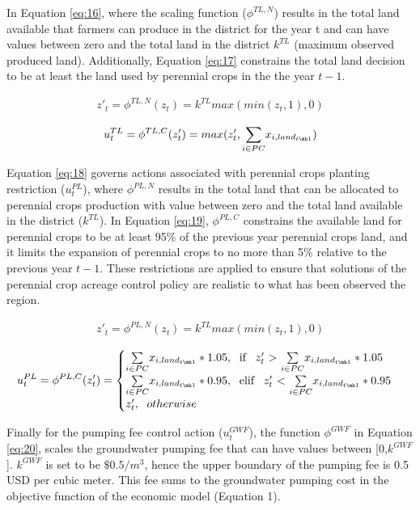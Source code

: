 \documentclass[a4paper,fleqn]{cas-sc}
\begin{document}
In Equation \ref{eq:16}, where the scaling function ($\phi^{TL,N}$) results in the total land available that farmers can produce in the district for the year t and can have values between zero and the total land in the district $k^{TL}$ (maximum observed produced land). Additionally, Equation \ref{eq:17} constrains the total land decision to be at least the land used by perennial crops in the the year $t-1$.

\begin{align}\label{eq:16}
z'_{t} = \phi^{TL,N}(z_{t}) = k^{TL}max(min(z_{t},1),0)
\end{align}

\begin{align}\label{eq:17}
u^{TL}_t = \phi^{TL,C}(z'_{t})= max(z'_{t},\underset{i \in PC}{\sum} x_{i,land_{t\mh1}})
\end{align}

Equation \ref{eq:18} governs actions associated with perennial crops planting restriction ($u^{PL}_t$), where $\phi^{PL,N}$ results in the total land that can be allocated to perennial crops production with value between zero and the total land available in the district ($k^{TL}$). In Equation \ref{eq:19}, $\phi^{PL,C}$ constrains the available land for perennial crops to be at least 95\% of the previous year perennial crops land, and it limits the expansion of perennial crops to no more than 5\% relative to the previous year $t-1$. These restrictions are applied to ensure that solutions of the perennial crop acreage control policy are realistic to what has been observed the region.

\begin{align}\label{eq:18}
z'_{t} = \phi^{PL,N}(z_{t}) = k^{TL}max(min(z_{t},1),0)
\end{align}

\begin{align}\label{eq:19}
u^{PL}_t = \phi^{PL,C}(z'_{t})= \begin{cases}
      \underset{i\in{PC}}{\sum} x_{i,land_{t\mh1}}*1.05,  \text{\; if \, $z'_{t}$  $>$ $\underset{i\in PC}{\sum}x_{i,land_{t\mh1}}*1.05$}\\
       \underset{i\in PC}{\sum} x_{i,land_{t\mh1}}*0.95, \text{\; elif \, $z'_{t}$  $<$ $\underset{i\in PC}{\sum}x_{i,land_{t\mh1}}*0.95$}\\
      z'_{t}, \text{\; $otherwise$}
\end{cases}     
\end{align}

Finally for the pumping fee control action ($u^{GWF}_t$), the function $\phi^{GWF}$ in Equation \ref{eq:20}, scales the groundwater pumping fee that can have values between [0,$k^{GWF}$]. $k^{GWF}$ is set to be $\$0.5/m^3$, hence the upper boundary of the pumping fee is 0.5 USD per cubic meter. This fee sums to the groundwater pumping cost in the objective function of the economic model (Equation 1).
\end{document}
